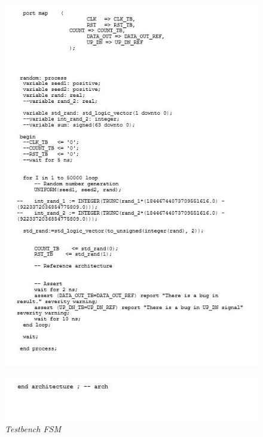 \begin{figure}[!htb]
	\centering
	\includegraphics[scale=0.8]{immagini/counter_tb2}
	\label{counter_tb2}
\end{figure}
\begin{figure}[!htb]
	\centering
	\includegraphics[scale=0.8]{immagini/counter_tb3}
	\caption{\textit{Testbench FSM}}
	\label{counter_tb3}
\end{figure}
\newpage
\newpage

